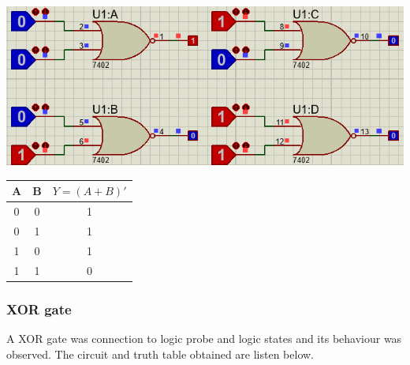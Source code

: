 \documentclass[a4paper, 12pt]{article}
\begin{document}
\begin{minipage}[c]{.7\textwidth}
  \centering
  \includegraphics[scale=0.5]{nor}
\end{minipage}
\begin{minipage}{.3\textwidth}
  \begin{center}
    \begin{tabular}{ |c|c|c| }
      \hline
      A & B & $Y=(A+B)'$ \\
      \hline
      0 & 0 & 1 \\
      \hline
      0 & 1 & 1 \\
      \hline
      1 & 0 & 1 \\
      \hline
      1 & 1 & 0 \\
      \hline
    \end{tabular}
  \end{center}
\end{minipage}


\subsubsection{XOR gate}
A XOR gate was connection to logic probe and logic states and its behaviour was observed.
The circuit and truth table obtained are listen below. \\
\end{document}
